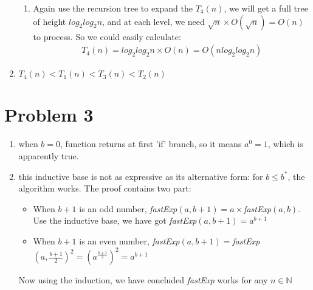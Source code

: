 \documentclass[paper=a4, fontsize=11pt]{scrartcl} %
\numberwithin{equation}{section} %
\numberwithin{figure}{section} %
\numberwithin{table}{section} %
\begin{document}
\begin{enumerate}[label={2.(\alph*)}]
\begin{enumerate}[label={\roman*.}]
      \item Again use the recursion tree to expand the $T_4(n)$, we will get a
	full tree of height $log_2log_2n$, and at each level, we need $\sqrt{n}
	\times O(\sqrt{n}) = O(n)$ to process. So we could easily calculate:
	\begin{align*}
	  T_4(n) = log_2log_2n \times O(n) = O(n log_2log_2n)
	\end{align*}

    \end{enumerate}

  \item $T_4(n) < T_1(n) < T_3(n) < T_2(n)$

\end{enumerate}


\section*{Problem 3}
\begin{enumerate}[label={3.\arabic*}]
  \item when $b=0$, function returns at first 'if' branch, so it means $a^0=1$, which is apparently true.

  \item this inductive base is not as expressive as its alternative form: for $b \leq b^*$, the algorithm works. The proof contains two part:
    \begin{itemize}
      \item When $b+1$ is an odd number, \textit{fastExp}$(a,b+1)=a\times$\textit{fastExp}$(a,b)$. Use the inductive base, we have got \textit{fastExp}$(a,b+1) = a^{b+1}$
      \item When $b+1$ is an even number, \textit{fastExp}$(a,b+1)=$\textit{fastExp}$(a, \frac{b+1}{2})^2= (a^{\frac{b+1}{2}})^2=a^{b+1}$ 
    \end{itemize}
    Now using the induction, we have concluded \textit{fastExp} works for any $n \in \mathbb{N}$

\end{enumerate}
\end{document}

